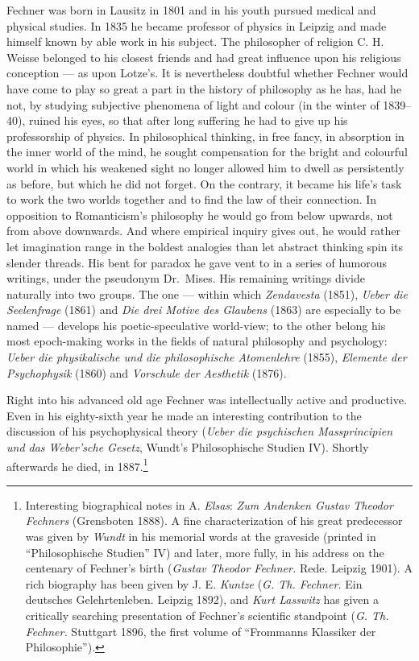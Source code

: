 \documentclass[12pt,a4paper]{book}
\newcommand{\opage}[1]{\marginnote{\footnotesize\textit{[#1]}}}
\begin{document}
Fechner was born in Lausitz in 1801 and in his youth pursued medical and physical
studies. In 1835 he became professor of physics in Leipzig and made himself known
by able work in his subject. The philosopher of religion C. H. Weisse belonged to
his closest friends and had great influence upon his religious conception --- as
upon Lotze's. It is nevertheless doubtful whether Fechner would have come to play
so great a part in the history of philosophy as he has, had he not, by studying
subjective phenomena of light and colour (in the winter of 1839--40), ruined his
eyes, so that after long suffering he had to give up his professorship of
physics. In philosophical thinking, in free fancy, in absorption in the inner
world of the mind, he sought compensation for the bright and colourful world in
which his weakened sight no longer allowed him to dwell as persistently as
before, but which he did not forget. On the contrary, it became his life's task
to work the two worlds together and to find the law of their connection. In
opposition to Romanticism's philosophy he would go from below upwards, not from
above downwards. And where empirical inquiry gives out, he would rather let
imagination range in the boldest analogies than let abstract \opage{528}thinking spin its
slender threads. His bent for paradox he gave vent to in a series of humorous
writings, under the pseudonym Dr.~Mises. His remaining writings divide naturally
into two groups. The one --- within which \textit{Zendavesta} (1851),
\textit{Ueber die Seelenfrage} (1861) and \textit{Die drei Motive des Glaubens}
(1863) are especially to be named --- develops his poetic-speculative world-view;
to the other belong his most epoch-making works in the fields of natural
philosophy and psychology: \textit{Ueber die physikalische und die philosophische
Atomenlehre} (1855), \textit{Elemente der Psychophysik} (1860) and
\textit{Vorschule der Aesthetik} (1876).

Right into his advanced old age Fechner was intellectually active and productive.
Even in his eighty-sixth year he made an interesting contribution to the
discussion of his psychophysical theory (\textit{Ueber die psychischen
Massprincipien und das Weber'sche Gesetz}, Wundt's Philosophische Studien IV).
Shortly afterwards he died, in 1887.\footnote{Interesting biographical notes in
A. \emph{Elsas}: \textit{Zum Andenken Gustav Theodor Fechners} (Grensboten 1888). A fine
characterization of his great predecessor was given by \emph{Wundt} in his memorial
words at the graveside (printed in ``Philosophische Studien'' IV) and later, more
fully, in his address on the centenary of Fechner's birth (\textit{Gustav Theodor
Fechner.} Rede. Leipzig 1901). A rich biography has been given by J. E. \emph{Kuntze}
(\textit{G. Th. Fechner.} Ein deutsches Gelehrtenleben. Leipzig 1892), and \emph{Kurt Lasswitz} has given a critically searching presentation of Fechner's scientific
standpoint (\textit{G. Th. Fechner.} Stuttgart 1896, the first volume of
``Frommanns Klassiker der Philosophie'').}
\end{document}
